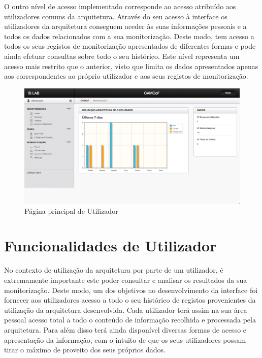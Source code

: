 O outro nível de acesso implementado corresponde ao acesso atribuído aos utilizadores comuns da arquitetura. Através do seu acesso à interface os utilizadores da arquitetura conseguem aceder às suas informações pessoais e a todos os dados relacionados com a sua monitorização. Deste modo, tem acesso a todos os seus registos de monitorização apresentados de diferentes formas e pode ainda efetuar consultas sobre todo o seu histórico. Este nível representa um acesso mais restrito que o anterior, visto que limita os dados apresentados apenas aos correspondentes ao próprio utilizador e aos seus registos de monitorização.

 \begin{figure}[htb]
   \centering
   \includegraphics[scale=0.29]{Images/home.png}
   \caption{Página principal de Utilizador}
\end{figure}

\section{Funcionalidades de Utilizador}

No contexto de utilização da arquitetura por parte de um utilizador, é extremamente importante este poder consultar e analisar os resultados da sua monitorização. Deste modo, um dos objetivos no desenvolvimento da interface foi fornecer aos utilizadores acesso a todo o seu histórico de registos provenientes da utilização da arquitetura desenvolvida. Cada utilizador terá assim na sua área pessoal acesso total a todo o conteúdo de informação recolhida e processada pela arquitetura. Para além disso terá ainda disponível diversas formas de acesso e apresentação da informação, com o intuito de que os seus utilizadores possam tirar o máximo de proveito dos seus próprios dados.

